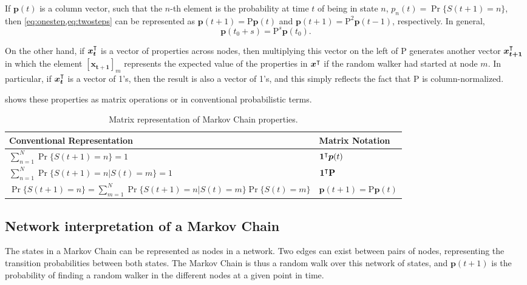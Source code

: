 \documentclass[letterpaper, 14pt]{extarticle}
\renewcommand{\vec}[1]{\bm{#1}}
\newcommand{\mat}[1]{\bm{\mathrm{#1}}}
\newcommand{\transp}{{\scalebox{.8}{$\intercal$}}}
\begin{document}
If $\vec{p}(t)$ is a column vector, such that the $n$-th element is the probability at time $t$ of being in state $n$, $p_n(t)=\Pr\{S(t+1)=n\}$, then \cref{eq:onestep,eq:twosteps} can be represented as $\vec{p}(t+1)=\mat{P}\vec{p}(t)$ and $\vec{p}(t+1)=\mat{P}^2\vec{p}(t-1)$, respectively. In general,
$$
	\vec{p}(t_0+s)=\mat{P}^s\vec{p}(t_0).
$$

On the other hand, if $\vec{x_t}^\transp$ is a vector of properties across nodes, then multiplying this vector on the left of $\mat{P}$ generates another vector $\vec{x_{t+1}}^\transp$ in which the element $[\vec{x_{t+1}}]_m$ represents the expected value of the properties in $\vec{x}^\transp$ if the random walker had started at node $m$. In particular, if $\vec{x_t}^\transp$ is a vector of 1's, then the result is also a vector of 1's, and this simply reflects the fact that $\mat{P}$ is column-normalized.

 shows these properties as matrix operations or in conventional probabilistic terms.
\begin{table}
\footnotesize
\centering
	\begin{tabular}{ll}
		\hline
		\textbf{Conventional Representation} & \textbf{Matrix Notation} \\
		\hline 
		$\sum_{n=1}^N \Pr\{S(t+1)=n\}=1$ & $\vec{1}^\transp\vec{p}(t)$ \\
		$\sum_{n=1}^N \Pr\{S(t+1)=n|S(t)=m\}=1$ & $\vec{1}^\transp\mat{P}$ \\
		$\Pr\{S(t+1)=n\}=\sum_{m=1}^N \Pr\{S(t+1)=n|S(t)=m\}\Pr\{S(t)=m\}$ & $\vec{p}(t+1)=\mat{P}\vec{p}(t)$ \\
		\hline 
	\end{tabular}
\caption{Matrix representation of Markov Chain properties.}
\label{tab:simpleprops}
\end{table}

\subsection{Network interpretation of a Markov Chain}
The states in a Markov Chain can be represented as nodes in a network. Two edges can exist between pairs of nodes, representing the transition probabilities between both states. The Markov Chain is thus a random walk over this network of states, and $\vec{p}(t+1)$ is the probability of finding a random walker in the different nodes at a given point in time.
 
\end{document}
